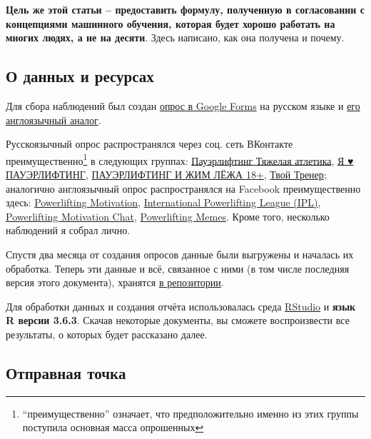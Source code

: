 \documentclass[
]{article}
\begin{document}
\textbf{Цель же этой статьи -- предоставить формулу, полученную в
согласовании с концепциями машинного обучения, которая будет хорошо
работать на многих людях, а не на десяти}. Здесь написано, как она
получена и почему.

\hypertarget{ux43e-ux434ux430ux43dux43dux44bux445-ux438-ux440ux435ux441ux443ux440ux441ux430ux445}{%
\subsection{О данных и
ресурсах}\label{ux43e-ux434ux430ux43dux43dux44bux445-ux438-ux440ux435ux441ux443ux440ux441ux430ux445}}

Для сбора наблюдений был создан
\href{https://forms.gle/R4zZqQJ3ggNdEuQ67}{опрос в Google Forms} на
русском языке и \href{https://forms.gle/dbthrvE5Y95beqUL9}{его
англоязычный аналог}.

Русскоязычный опрос распространялся через соц. сеть ВКонтакте
преимущественно\footnote{``преимущественно'' означает, что
  предположительно именно из этих группы поступила основная масса
  опрошенных} в следующих группах:
\href{https://vk.com/powerliftingnews}{Пауэрлифтинг \textbar{} Тяжелая
атлетика}, \href{https://vk.com/ilovepowerlifting}{Я ♥ ПАУЭРЛИФТИНГ},
\href{https://vk.com/powerliftingworld}{ПАУЭРЛИФТИНГ И ЖИМ ЛЁЖА 18+},
\href{https://vk.com/tvoytrenercom}{Твой Тренер}; аналогично
англоязычный опрос распространялся на Facebook преимущественно здесь:
\href{https://www.facebook.com/PowerliftingMotivation/}{Powerlifting
Motivation},
\href{https://www.facebook.com/groups/IPLPowerlifting/}{International
Powerlifting League (IPL)},
\href{https://www.facebook.com/groups/powerliftingmotivation/}{Powerlifting
Motivation Chat},
\href{https://www.facebook.com/groups/powerliftingmemes/}{Powerlifting
Memes}. Кроме того, несколько наблюдений я собрал лично.

Спустя два месяца от создания опросов данные были выгружены и началась
их обработка. Теперь эти данные и всё, связанное с ними (в том числе
последняя версия этого документа), хранятся
\href{https://github.com/PasaOpasen/Powerlifting-training-diary-and-articles/tree/master/Estimating\%20RM}{в
репозитории}.

Для обработки данных и создания отчёта использовалась среда
\href{https://rstudio.com}{RStudio} и \textbf{язык R версии 3.6.3}.
Скачав некоторые документы, вы сможете воспроизвести все результаты, о
которых будет рассказано далее.

\hypertarget{ux43eux442ux43fux440ux430ux432ux43dux430ux44f-ux442ux43eux447ux43aux430}{%
\subsection{Отправная
точка}\label{ux43eux442ux43fux440ux430ux432ux43dux430ux44f-ux442ux43eux447ux43aux430}}
\end{document}
